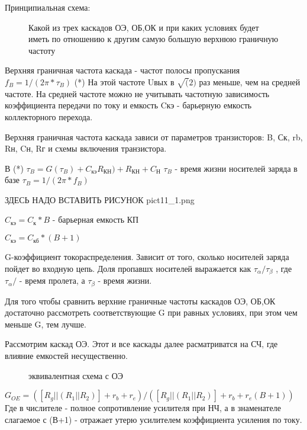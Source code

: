 
Принципиальная схема:
\begin{center}
        \begin{figure}[h!]
                \caption{Какой из трех каскадов ОЭ, ОБ,ОК и при каких условиях будет иметь по отношению к другим самую большую верхнюю граничную частоту}
        \end{figure}
\end{center}


Верхняя граничная частота каскада - частот полосы пропускания
$f_B = 1/(2\pi*\tau_B)$		(*)
На этой частоте Uвых в $\surd(2)$ раз меньше, чем на средней частоте. На средней частоте можно не учитывать частотную зависимость коэффициента передачи по току и емкость Cкэ - барьерную емкость коллекторного перехода.

Верхняя граничная частота каскада зависи от параметров транзисторов: B, Ск, rb, Rн, Cн, Rг и схемы включения транзистора.

В (*) $\tau_B = G(\tau_B) + C_\textit{кэ}R_\textit{КН})+R_\textit{КН}+C_\textit{Н}$
$\tau_B$ - время жизни носителей заряда в базе
$\tau_B = 1/(2\pi*f_B)$	

ЗДЕСЬ НАДО ВСТАВИТЬ РИСУНОК pict11_1.png


$C_\textit{кэ} = C_\textit{к}*B$ - барьерная емкость КП

$C_\textit{кэ} = C_\textit{кб}*(B+1)$

G-коэффициент токораспределения. Зависит от того, сколько носителей заряда пойдет во входную цепь.
Доля пропавшх носителей выражается как $\tau_\alpha/\tau_\beta$ , где $\tau_\alpha/$ - время пролета, а $\tau_\beta$ - время жизни.

Для  того чтобы сравнить верхние граничные частоты каскадов ОЭ, ОБ,ОК достаточно рассмотреть соответствующие G при равных условиях, при этом чем меньше G, тем лучше.

Рассмотрим каскад ОЭ.
Этот и все каскады далее расматриватся на СЧ, где влияние емкостей несущественно.
\begin{center}
        \begin{figure}[h!]
                \caption{эквивалентная схема с ОЭ}
                \label{EOE}
        \end{figure}
\end{center}

$G_\textit{OE} = ([R_g ||(R_1||R_2)] + r_b+r_e)/([R_g ||(R_1||R_2)] + r_b+r_e(B+1))$
Где в числителе - полное сопротивление усилителя при НЧ, а в знаменателе слагаемое с (В+1) - отражает утерю усилителем коэффициента усиления по току.

